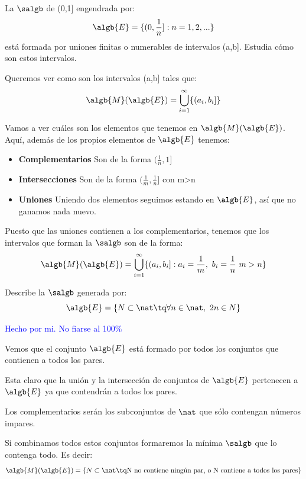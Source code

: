 \begin{problem}[8]
La $\salgb$ de (0,1] engendrada por:
\[\algb{E}= \{(0, \frac{1}{n}]: n=1,2,...\}\]
está formada por uniones finitas o numerables de intervalos (a,b]. Estudia cómo son estos intervalos.

\solution
Queremos ver como son los intervalos (a,b] tales que:
\[\algb{M}(\algb{E})=\bigcup_{i=1}^{\infty}\{(a_i, b_i]\}\]

Vamos a ver cuáles son los elementos que tenemos en $\algb{M}(\algb{E})$. Aquí, además de los propios elementos de $\algb{E}$ tenemos:
\begin{itemize}
\item \textbf{Complementarios} Son de la forma $(\frac{1}{n}, 1]$

\item \textbf{Intersecciones} Son de la forma $(\frac{1}{m}, \frac{1}{n}]$ con m>n

\item \textbf{Uniones} Uniendo dos elementos seguimos estando en $\algb{E}$, así que no ganamos nada nuevo.
\end{itemize}

Puesto que las uniones contienen a los complementarios, tenemos que los intervalos que forman la $\salgb$ son de la forma:
\[\algb{M}(\algb{E})=\bigcup_{i=1}^{\infty}\{(a_i, b_i]: a_i =\frac{1}{m}, \ b_i = \frac{1}{n} \ m>n\}\]
\end{problem}

\begin{problem}[9]
Describe la $\salgb$ generada por:
\[\algb{E}= \{N \subset \nat \tq \forall n \in \nat, \ 2n \in N\}\]

\solution
\textcolor{blue}{Hecho por mi. No fiarse al 100\%}

Vemos que el conjunto $\algb{E}$ está formado por todos los conjuntos que contienen a todos los pares.

Esta claro que la unión y la intersección de conjuntos de $\algb{E}$ pertenecen a $\algb{E}$ ya que contendrán a todos los pares.

Los complementarios serán los subconjuntos de $\nat$ que sólo contengan números impares.

Si combinamos todos estos conjuntos formaremos la mínima $\salgb$ que lo contenga todo. Es decir:
\[\algb{M}(\algb{E})=\{N \subset \nat \tq \text{N no contiene ningún par, o N contiene a todos los pares}\}\]
\end{problem}

